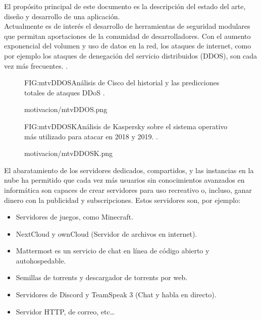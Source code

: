 El propósito principal de este documento es la descripción del estado del arte, diseño y desarrollo de una aplicación.
\\Actualmente es de interés el desarrollo de herramientas de seguridad modulares que permitan aportaciones de la comunidad de desarrolladores. Con el aumento exponencial del volumen y uso de datos en la red, los ataques de internet, como por ejemplo los ataques de denegación del servicio distribuidos (DDOS), son cada vez más frecuentes. \cite{mtvDDOSEXP}.

\begin{figure}[Análisis de Cisco del historial y las predicciones totales de ataques DDoS.]{FIG:mtvDDOS}{Análisis de Cisco del historial y las predicciones totales de ataques DDoS \cite{mtvDDOSCISCO}.}
  \begin{image}{}{}{motivacion/mtvDDOS.png}
  \end{image}
\end{figure}

\begin{figure}[Análisis de Kaspersky sobre DDOS.]{FIG:mtvDDOSK}{Análisis de Kaspersky sobre el sistema operativo más utilizado para atacar en 2018 y 2019. \cite{mtvDDOSK}.}
  \begin{image}{}{}{motivacion/mtvDDOSK.png}
  \end{image}
\end{figure}


El abaratamiento de los servidores dedicados, compartidos, y las instancias en la nube \cite{mtvPrecios} ha permitido que cada vez más usuarios sin conocimientos avanzados en informática son capaces de crear servidores para uso recreativo o, incluso, ganar dinero con la publicidad y subscripciones. Estos servidores son, por ejemplo:
\begin{itemize}
\item Servidores de juegos, como Minecraft.
\item NextCloud y ownCloud (Servidor de archivos en internet).
\item Mattermost es un servicio de chat en línea de código abierto y autohospedable.
\item Semillas de torrents y descargador de torrents por web.
\item Servidores de Discord y TeamSpeak 3 (Chat y habla en directo).
\item Servidor HTTP, de correo, etc…
\end{itemize}


